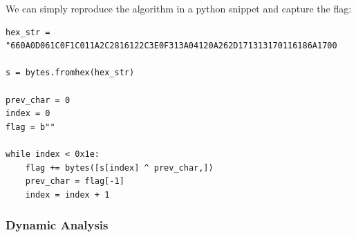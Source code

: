 \documentclass{article}
\begin{document}
\noindent\linebreak
We can simply reproduce the algorithm in a python snippet and capture the flag:
\begin{verbatim}
hex_str = "660A0D061C0F1C011A2C2816122C3E0F313A04120A262D171313170116186A1700

s = bytes.fromhex(hex_str)

prev_char = 0
index = 0
flag = b""

while index < 0x1e:
    flag += bytes([s[index] ^ prev_char,])
    prev_char = flag[-1]
    index = index + 1
\end{verbatim}

\pagebreak

\subsubsection{Dynamic Analysis}
\end{document}
